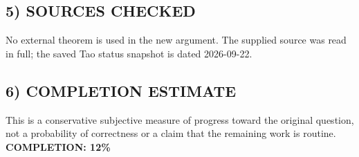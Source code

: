 \subsection{5) SOURCES CHECKED}
No external theorem is used in the new argument. The supplied source was read in full; the saved Tao status snapshot is dated 2026-09-22.
\subsection{6) COMPLETION ESTIMATE}
This is a conservative subjective measure of progress toward the original question, not a probability of correctness or a claim that the remaining work is routine.
\textbf{COMPLETION: 12\%}
